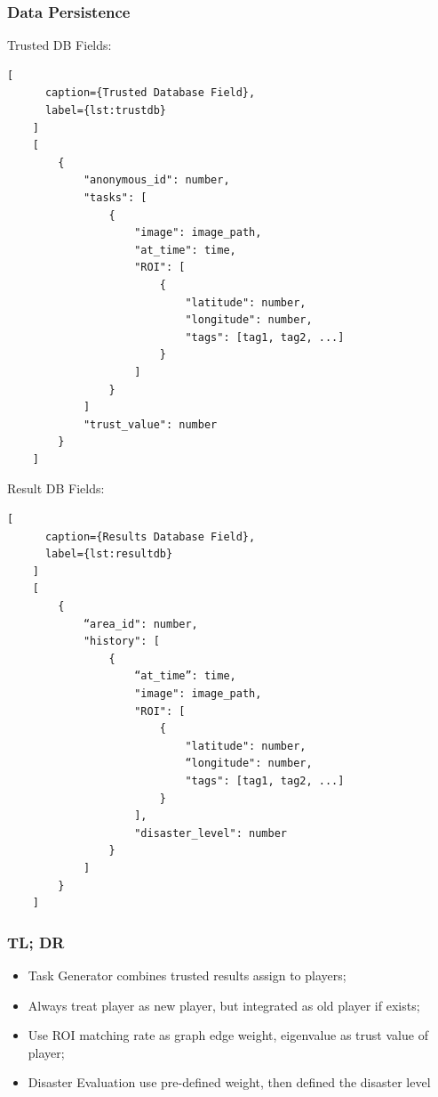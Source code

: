 \documentclass[paper=a4, fontsize=11pt]{scrartcl} %
\numberwithin{equation}{section} %
\numberwithin{figure}{section} %
\numberwithin{table}{section} %
\begin{document}
    \subsubsection{Data Persistence}

    Trusted DB Fields:

    \begin{lstlisting}[
      caption={Trusted Database Field},
      label={lst:trustdb}
    ]
    [
        {
            "anonymous_id": number,
            "tasks": [
                {
                    "image": image_path,
                    "at_time": time, 
                    "ROI": [
                        {
                            "latitude": number,
                            "longitude": number,
                            "tags": [tag1, tag2, ...]
                        }
                    ]
                }
            ]
            "trust_value": number
        }
    ]
    \end{lstlisting}

    Result DB Fields:

    \begin{lstlisting}[
      caption={Results Database Field},
      label={lst:resultdb}
    ]
    [
        {
            “area_id": number,
            "history": [
                {
                    “at_time”: time,
                    "image": image_path,
                    "ROI": [
                        {
                            "latitude": number,
                            “longitude": number,
                            "tags": [tag1, tag2, ...]
                        }
                    ],
                    "disaster_level": number
                }
            ]
        }
    ]
    \end{lstlisting}

    \subsubsection{TL; DR}

    \begin{itemize}
      \item Task Generator combines trusted results assign to players;
      \item Always treat player as new player, but integrated as old player if exists;
      \item Use ROI matching rate as graph edge weight, eigenvalue as trust value of player;
      \item Disaster Evaluation use pre-defined weight, then defined the disaster level
    \end{itemize}
\end{document}
